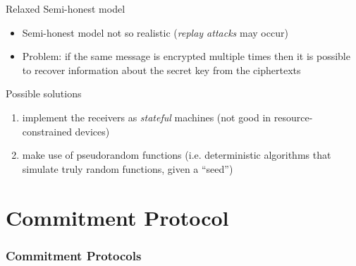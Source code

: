 \begin{frame}
  \begin{block}{Relaxed Semi-honest model}
   \begin{itemize}
    \item Semi-honest model not so realistic (\emph{replay attacks} may occur)
    \item \alert{Problem:} if the same message is encrypted multiple times then it is possible to recover information about the secret key from the ciphertexts\\
   \end{itemize}
  \end{block}

 \begin{block}{Possible solutions}
    \begin{enumerate}
     \item implement the receivers as \emph{stateful} machines (not good in resource-constrained devices)
     \item make use of pseudorandom functions (i.e. deterministic algorithms that simulate truly random functions, given a ``seed'')
    \end{enumerate}
 \end{block}
 
\end{frame}

\section{Commitment Protocol}
\begin{frame}
\frametitle{Commitment Protocols}

\end{frame}

\begin{frame}
 
\end{frame}

\begin{frame}
 \begin{center}\end{center}

\end{frame}